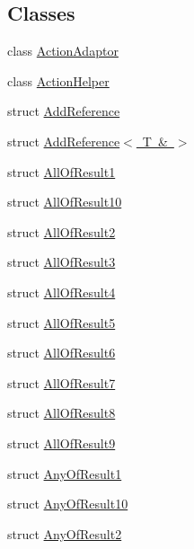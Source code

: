 \subsection*{Classes}
\begin{DoxyCompactItemize}
\item 
class \mbox{\hyperlink{classtesting_1_1internal_1_1_action_adaptor}{Action\+Adaptor}}
\item 
class \mbox{\hyperlink{classtesting_1_1internal_1_1_action_helper}{Action\+Helper}}
\item 
struct \mbox{\hyperlink{structtesting_1_1internal_1_1_add_reference}{Add\+Reference}}
\item 
struct \mbox{\hyperlink{structtesting_1_1internal_1_1_add_reference_3_01_t_01_6_01_4}{Add\+Reference$<$ T \& $>$}}
\item 
struct \mbox{\hyperlink{structtesting_1_1internal_1_1_all_of_result1}{All\+Of\+Result1}}
\item 
struct \mbox{\hyperlink{structtesting_1_1internal_1_1_all_of_result10}{All\+Of\+Result10}}
\item 
struct \mbox{\hyperlink{structtesting_1_1internal_1_1_all_of_result2}{All\+Of\+Result2}}
\item 
struct \mbox{\hyperlink{structtesting_1_1internal_1_1_all_of_result3}{All\+Of\+Result3}}
\item 
struct \mbox{\hyperlink{structtesting_1_1internal_1_1_all_of_result4}{All\+Of\+Result4}}
\item 
struct \mbox{\hyperlink{structtesting_1_1internal_1_1_all_of_result5}{All\+Of\+Result5}}
\item 
struct \mbox{\hyperlink{structtesting_1_1internal_1_1_all_of_result6}{All\+Of\+Result6}}
\item 
struct \mbox{\hyperlink{structtesting_1_1internal_1_1_all_of_result7}{All\+Of\+Result7}}
\item 
struct \mbox{\hyperlink{structtesting_1_1internal_1_1_all_of_result8}{All\+Of\+Result8}}
\item 
struct \mbox{\hyperlink{structtesting_1_1internal_1_1_all_of_result9}{All\+Of\+Result9}}
\item 
struct \mbox{\hyperlink{structtesting_1_1internal_1_1_any_of_result1}{Any\+Of\+Result1}}
\item 
struct \mbox{\hyperlink{structtesting_1_1internal_1_1_any_of_result10}{Any\+Of\+Result10}}
\item 
struct \mbox{\hyperlink{structtesting_1_1internal_1_1_any_of_result2}{Any\+Of\+Result2}}
\item 

\end{DoxyCompactItemize}
